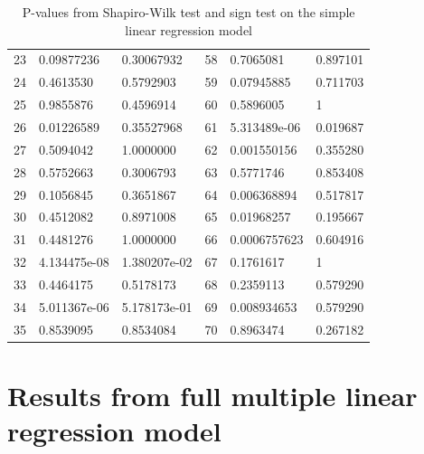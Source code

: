 \begin{table}[H]
\begin{tabular}{c:ll|c:ll}
        23 & 0.09877236 & 0.30067932 & 58 & 0.7065081 & 0.897101\\ 
        24 & 0.4613530 & 0.5792903 & 59 & 0.07945885 & 0.711703 \\ 
        25 & 0.9855876 & 0.4596914 & 60 &  0.5896005 & 1\\ 
        26 & 0.01226589 & 0.35527968 & 61 & 5.313489e-06 & 0.019687\\
        27 & 0.5094042 & 1.0000000 & 62 & 0.001550156 & 0.355280\\ 
        28 & 0.5752663 & 0.3006793 & 63 & 0.5771746 & 0.853408\\ 
        29 & 0.1056845 & 0.3651867 & 64 & 0.006368894 & 0.517817\\ 
        30 & 0.4512082 & 0.8971008 & 65 & 0.01968257 & 0.195667\\ 
        31 & 0.4481276 & 1.0000000 & 66 & 0.0006757623 & 0.604916\\ 
        32 & 4.134475e-08 & 1.380207e-02 & 67 & 0.1761617 & 1\\ 
        33 & 0.4464175 & 0.5178173 & 68 & 0.2359113 & 0.579290\\ 
        34 & 5.011367e-06 & 5.178173e-01 & 69 & 0.008934653 &0.579290 \\ 
        35 & 0.8539095 & 0.8534084 & 70 & 0.8963474 & 0.267182\\
        \hline
    \end{tabular}
    \caption{P-values from Shapiro-Wilk test and sign test on the simple linear regression model}
    \label{tab: shapiro_simple_lm}
\end{table}

\pagebreak

\section{Results from full multiple linear regression model}
